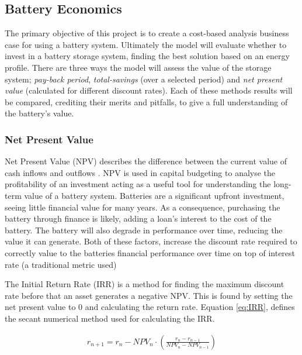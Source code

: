 \subsection{Battery Economics}\label{battery-economics}

The primary objective of this project is to create a cost-based analysis
business case for using a battery system. Ultimately the model will
evaluate whether to invest in a battery storage system, finding the best
solution based on an energy profile. There are three ways the model will
assess the value of the storage system; \emph{pay-back period},
\emph{total-savings} (over a selected period) and \emph{net present
value} (calculated for different discount rates). Each of these methods
results will be compared, crediting their merits and pitfalls, to give a
full understanding of the battery's value.

\subsubsection{Net Present Value}\label{net-present-value}

Net Present Value (NPV) describes the difference between the current
value of cash inflows and outflows \cite{NetPrese35:online}. NPV is used
in capital budgeting to analyse the profitability of an investment
acting as a useful tool for understanding the long-term value of a
battery system. Batteries are a significant upfront investment, seeing
little financial value for many years. As a consequence, purchasing the
battery through finance is likely, adding a loan's interest to the cost
of the battery. The battery will also degrade in performance over time,
reducing the value it can generate. Both of these factors, increase the
discount rate required to correctly value to the batteries financial
performance over time on top of interest rate (a traditional metric
used)

The Initial Return Rate (IRR) is a method for finding the maximum
discount rate before that an asset generates a negative NPV. This is
found by setting the net present value to 0 and calculating the return
rate. Equation \ref{eq:IRR}, defines the secant numerical method used
for calculating the IRR.

\begin{align}
r_{ n+1 }=r_{ n }-{ NPV }_{ n }\cdot \left( \frac { r_{ n }-r_{ n-1 } }{ { NPV }_{ n }-{ NPV }_{ n-1 } }  \right)
\label{eq:IRR}
\end{align}

